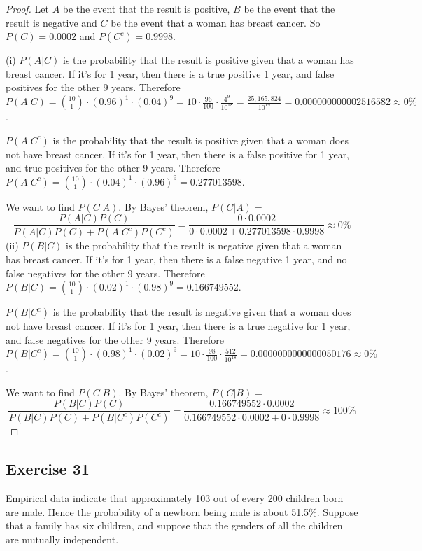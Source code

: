 \documentclass[14pt]{extarticle}
\begin{document}
\begin{proof}
     Let \(A\) be the event that the result is positive, \(B\) be the event that the result is negative and \(C\) be the event
     that a woman has breast cancer. So \(P(C) = 0.0002\) and \(P(C^c) = 0.9998\).

     (i) \(P(A|C)\) is the probability that the result is positive given that a woman has breast cancer. If it's for 1 year, then
     there is a true positive 1 year, and false positives for the other 9 years. Therefore \(P(A|C) = \binom{10}{1} \cdot
     (0.96)^1 \cdot (0.04)^9 = 10 \cdot \frac{96}{100} \cdot \frac{4^9}{10^{18}} = \frac{25,165,824}{10^{19}} =
     0.000000000002516582 \approx 0\%\).

     \(P(A|C^c)\) is the probability that the result is positive given that a woman does not have breast cancer. If it's for 1
     year, then there is a false positive for 1 year, and true positives for the other 9 years. Therefore \(P(A|C^c) =
     \binom{10}{1} \cdot (0.04)^1 \cdot (0.96)^9 = 0.277013598\).

     We want to find \(P(C|A)\). By Bayes' theorem, \(P(C|A) =\)
     \[
          \frac{P(A|C)P(C)}{P(A|C)P(C) + P(A|C^c)P(C^c)} = \frac{0 \cdot 0.0002}{0 \cdot 0.0002 + 0.277013598 \cdot 0.9998} \approx 0\%
     \]
     (ii) \(P(B|C)\) is the probability that the result is negative given that a woman has breast cancer. If it's for 1 year, then
     there is a false negative 1 year, and no false negatives for the other 9 years. Therefore \(P(B|C) = \binom{10}{1} \cdot
     (0.02)^1 \cdot (0.98)^9 = 0.166749552\).

     \(P(B|C^c)\) is the probability that the result is negative given that a woman does not have breast cancer. If it's for 1
     year, then there is a true negative for 1 year, and false negatives for the other 9 years. Therefore \(P(B|C^c) =
     \binom{10}{1} \cdot (0.98)^1 \cdot (0.02)^9 = 10 \cdot \frac{98}{100} \cdot \frac{512}{10^{18}} =
     0.0000000000000050176 \approx 0\%\).

     We want to find \(P(C|B)\). By Bayes' theorem, \(P(C|B) =\)
     \[
          \frac{P(B|C)P(C)}{P(B|C)P(C) + P(B|C^c)P(C^c)} = \frac{0.166749552 \cdot 0.0002}{0.166749552 \cdot 0.0002 + 0
               \cdot 0.9998} \approx 100\%
     \]
\end{proof}

\subsection{Exercise 31}
Empirical data indicate that approximately 103 out of every 200 children born are male. Hence the probability of a newborn
being male is about 51.5\%. Suppose that a family has six children, and suppose that the genders of all the children are
mutually independent.
\end{document}
